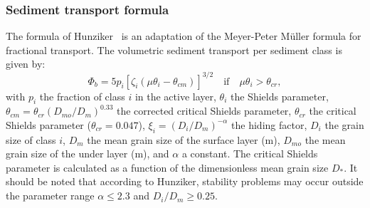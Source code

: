 \subsubsection{Sediment transport formula}
The formula of Hunziker~\cite{Hunziker} is an adaptation of the Meyer-Peter M\"{u}ller formula for fractional transport. The volumetric sediment transport per sediment class is given by:
\begin{equation}\label{eq:Hunziker}
\Phi_b  = 5 p_i \left[\zeta_i\left( \mu \theta_i -\theta_{cm} \right) \right]^{3/2} \quad\text{if}\quad \mu \theta_i > \theta_{cr}, 
\end{equation}
with $p_i$ the fraction of class $i$ in the active layer, $\theta_i$ the Shields parameter, 
$\theta_{cm} = \theta_{cr}\left(D_{mo}/D_m\right)^{0.33}$ the corrected critical Shields parameter, $\theta_{cr}$ the critical Shields parameter ($\theta_{cr}=0.047$), $\xi_{i} =\left(D_i/D_m\right)^{-\alpha}$ the hiding factor, $D_i$ the grain size of class $i$, $D_m$ the mean grain size of the surface layer (m), $D_{mo}$ the mean grain size of the under layer (m), and $\alpha$ a constant. The critical Shields parameter is calculated as a function of the
dimensionless mean grain size $D_*$. It should be noted that according to
Hunziker, stability problems may occur outside the parameter range $\alpha \leq 2.3$ and $D_i/D_m \geq 0.25$.





